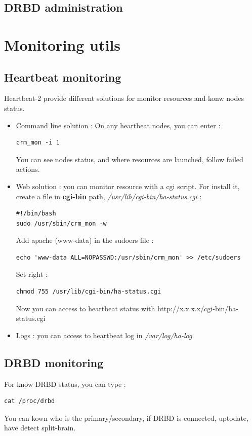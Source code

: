 \documentclass[a4paper,10pt]{report}
\begin{document}
\subsection{DRBD administration}

\section{Monitoring utils}

\subsection{Heartbeat monitoring}
Heartbeat-2 provide different solutions for monitor resources and konw nodes status.
\begin{itemize}
 \item Command line solution : On any heartbeat nodes, you can enter :
\begin{lstlisting}
crm_mon -i 1
\end{lstlisting}
You can see nodes status, and where resources are launched, follow failed actions.
\item Web solution : you can monitor resource with a cgi script. For install it, create a file in \textbf{cgi-bin} path, \textit{/usr/lib/cgi-bin/ha-status.cgi} :
\begin{lstlisting}
#!/bin/bash
sudo /usr/sbin/crm_mon -w
\end{lstlisting}
Add apache (www-data) in the sudoers file :
\begin{lstlisting}
echo 'www-data ALL=NOPASSWD:/usr/sbin/crm_mon' >> /etc/sudoers
\end{lstlisting}
Set right :
\begin{lstlisting}
chmod 755 /usr/lib/cgi-bin/ha-status.cgi
\end{lstlisting}
Now you can access to heartbeat status with http://x.x.x.x/cgi-bin/ha-status.cgi
\item Logs : you can access to heartbeat log in \textit{/var/log/ha-log}

\end{itemize}


\subsection{DRBD monitoring}
For know DRBD status, you can type :
\begin{lstlisting}
cat /proc/drbd
\end{lstlisting}
You can kown who is the primary/secondary, if DRBD is connected, uptodate, have detect split-brain.
\end{document}
